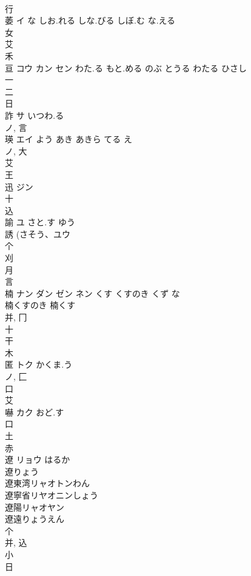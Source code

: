 \documentclass[8pt]{extreport}
\begin{document}
\begin{CJK}{UTF8}{min}
\\	行 
\\	萎	イ	な しお.れる しな.びる しぼ.む な.える	
\\	女 
\\	艾 
\\	禾 
\\	亘	コウ カン セン	わた.る もと.める のぶ とうる わたる ひさし	
\\	一 
\\	二 
\\	日 
\\	詐	サ	いつわ.る	
\\	ノ, 言 
\\	瑛	エイ	よう あき あきら てる え	
\\	ノ, 大 
\\	艾 
\\	王 
\\	迅	ジン		
\\	十 
\\	込 
\\	諭	ユ	さと.す ゆう	
\\	誘 (さそう、ユウ 
\\	个 
\\	刈 
\\	月 
\\	言 
\\	楠	ナン ダン ゼン ネン	くす くすのき くず な	
\\	楠くすのき 楠くす 
\\	并, 冂 
\\	十 
\\	干 
\\	木 
\\	匿	トク	かくま.う	
\\	ノ, 匚 
\\	口 
\\	艾 
\\	嚇	カク	おど.す	
\\	口 
\\	土 
\\	赤 
\\	遼	リョウ	はるか	
\\	遼りょう 
\\	遼東湾リャオトンわん 
\\	遼寧省リヤオニンしょう 
\\	遼陽リャオヤン 
\\	遼遠りょうえん 
\\	个 
\\	并, 込 
\\	小 
\\	日 

\end{CJK}
\end{document}
